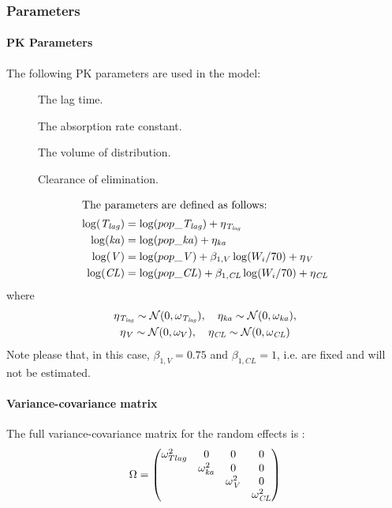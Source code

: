 \subsubsection{Parameters}

\paragraph{PK Parameters}

The following PK parameters are used in the model:
\begin{description}
\item[\Tlag] The lag time.
\item[\ka] The absorption rate constant.
\item[] The volume of distribution.
\item[\CL] Clearance of elimination.
\end{description}

\begin{align*}
\intertext{The parameters are defined as follows:}
\log(\Tlag) &= \log(pop\_\Tlag) + \eta_\Tlag\\
\log(\ka) &= \log(pop\_\ka) + \eta_\ka\\
\log(\var{V}) &= \log(pop\_\var{V}) + \beta_{1,V} \log(W_i/70) + \eta_\var{V}\\
\log(\CL) &= \log(pop\_\CL) + \beta_{1,\CL} \log(W_i/70) + \eta_\CL
\end{align*}
where
\begin{gather*}
\eta_\Tlag \sim \mathcal{N}(0, \omega_{\Tlag}), \quad \eta_\ka \sim \mathcal{N}(0, \omega_{\ka}),\\
\eta_\var{V} \sim  \mathcal{N}(0, \omega_{V}), \quad \eta_\CL \sim \mathcal{N}(0, \omega_{\CL})
\end{gather*}
Note please that, in this case, $\beta_{1,V}=0.75$ and $\beta_{1,CL}=1$, i.e. are fixed and will not be estimated.

\paragraph{Variance-covariance matrix}
The full variance-covariance matrix for the random effects is :
\begin{equation*}
 \Omega =
 \begin{pmatrix}
  \omega_{Tlag}^2 	& 0 				& 0                                 & 0  \\
   			  	& \omega_{\ka}^2	& 0                                 & 0  \\
  				& 				& \omega_{\var{V}}^2     & 0  \\
 				&				&                                    & \omega_{\CL}^2 \\
 \end{pmatrix}
\end{equation*}

